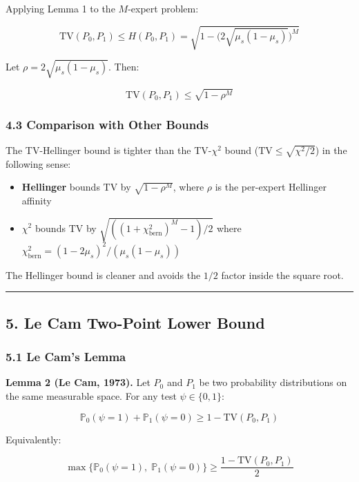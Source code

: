 \documentclass[
  12pt,
]{article}
\providecommand{\tightlist}{%
  \setlength{\itemsep}{0pt}\setlength{\parskip}{0pt}}
\begin{document}
Applying Lemma 1 to the \(M\)-expert problem:

\[\text{TV}(P_0, P_1) \leq H(P_0, P_1) = \sqrt{1 - \bigl(2\sqrt{\mu_s(1-\mu_s)}\bigr)^M}\]

Let \(\rho = 2\sqrt{\mu_s(1-\mu_s)}\). Then:

\[\text{TV}(P_0, P_1) \leq \sqrt{1 - \rho^M}\]

\subsubsection{4.3 Comparison with Other
Bounds}\label{comparison-with-other-bounds}

The TV-Hellinger bound is tighter than the TV-\(\chi^2\) bound
(\(\text{TV} \leq \sqrt{\chi^2/2}\)) in the following sense:

\begin{itemize}
\tightlist
\item
  \textbf{Hellinger} bounds \(\text{TV}\) by \(\sqrt{1 - \rho^M}\),
  where \(\rho\) is the per-expert Hellinger affinity
\item
  \textbf{\(\chi^2\)} bounds \(\text{TV}\) by
  \(\sqrt{((1+\chi^2_{\text{bern}})^M - 1)/2}\) where
  \(\chi^2_{\text{bern}} = (1-2\mu_s)^2/(\mu_s(1-\mu_s))\)
\end{itemize}

The Hellinger bound is cleaner and avoids the \(1/2\) factor inside the
square root.

\begin{center}\rule{0.5\linewidth}{0.5pt}\end{center}

\subsection{5. Le Cam Two-Point Lower
Bound}\label{le-cam-two-point-lower-bound}

\subsubsection{5.1 Le Cam's Lemma}\label{le-cams-lemma}

\textbf{Lemma 2 (Le Cam, 1973).} Let \(P_0\) and \(P_1\) be two
probability distributions on the same measurable space. For any test
\(\psi \in \{0,1\}\):

\[\mathbb{P}_0(\psi = 1) + \mathbb{P}_1(\psi = 0) \geq 1 - \text{TV}(P_0, P_1)\]

Equivalently:

\[\max\bigl\{\mathbb{P}_0(\psi = 1),\; \mathbb{P}_1(\psi = 0)\bigr\} \geq \frac{1 - \text{TV}(P_0, P_1)}{2}\]
\end{document}
